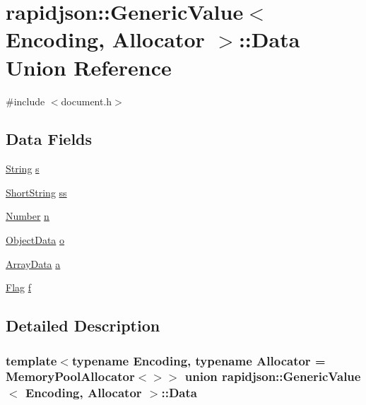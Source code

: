 \hypertarget{unionrapidjson_1_1_generic_value_1_1_data}{}\section{rapidjson\+::Generic\+Value$<$ Encoding, Allocator $>$\+::Data Union Reference}
\label{unionrapidjson_1_1_generic_value_1_1_data}


{\ttfamily \#include $<$document.\+h$>$}

\subsection*{Data Fields}
\begin{DoxyCompactItemize}
\item 
\mbox{\hyperlink{structrapidjson_1_1_generic_value_1_1_string}{String}} \mbox{\hyperlink{unionrapidjson_1_1_generic_value_1_1_data_aeb486daed8565779613fefe9a92b5e73}{s}}
\item 
\mbox{\hyperlink{structrapidjson_1_1_generic_value_1_1_short_string}{Short\+String}} \mbox{\hyperlink{unionrapidjson_1_1_generic_value_1_1_data_a9d91531b96cea2f7e459ceab1d6fb55e}{ss}}
\item 
\mbox{\hyperlink{unionrapidjson_1_1_generic_value_1_1_number}{Number}} \mbox{\hyperlink{unionrapidjson_1_1_generic_value_1_1_data_a0163c333b902c6dfd1dccc21082f40eb}{n}}
\item 
\mbox{\hyperlink{structrapidjson_1_1_generic_value_1_1_object_data}{Object\+Data}} \mbox{\hyperlink{unionrapidjson_1_1_generic_value_1_1_data_acfe05f4d8b4c4ecef9c27137cdf9ed42}{o}}
\item 
\mbox{\hyperlink{structrapidjson_1_1_generic_value_1_1_array_data}{Array\+Data}} \mbox{\hyperlink{unionrapidjson_1_1_generic_value_1_1_data_a38d33576b9ff6ad4e50046999dcfd9ad}{a}}
\item 
\mbox{\hyperlink{structrapidjson_1_1_generic_value_1_1_flag}{Flag}} \mbox{\hyperlink{unionrapidjson_1_1_generic_value_1_1_data_a316504c65a492283fd6d87b017f58e29}{f}}
\end{DoxyCompactItemize}


\subsection{Detailed Description}
\subsubsection*{template$<$typename Encoding, typename Allocator = Memory\+Pool\+Allocator$<$$>$$>$\newline
union rapidjson\+::\+Generic\+Value$<$ Encoding, Allocator $>$\+::\+Data}



